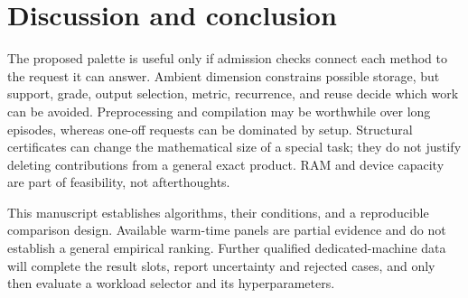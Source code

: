 \documentclass[11pt,a4paper]{article}
\begin{document}
\section{Discussion and conclusion}
The proposed palette is useful only if admission checks connect
each method to the request it can answer. Ambient dimension
constrains possible storage, but support, grade, output selection,
metric, recurrence, and reuse decide which work can be avoided.
Preprocessing and compilation may be worthwhile over long
episodes, whereas one-off requests can be dominated by setup.
Structural certificates can change the mathematical size of a
special task; they do not justify deleting contributions from a
general exact product. RAM and device capacity are part of
feasibility, not afterthoughts.

This manuscript establishes algorithms, their conditions, and a
reproducible comparison design. Available warm-time panels are partial
evidence and do not establish a general empirical ranking.
Further qualified dedicated-machine data will complete the result slots,
report uncertainty and rejected cases,
and only then evaluate a workload selector and its
hyperparameters.
\end{document}
